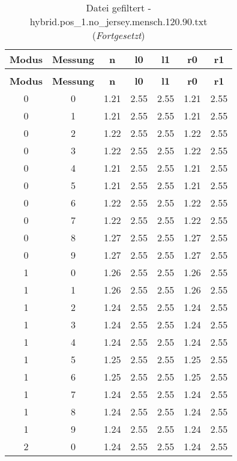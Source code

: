 \begin{longtable}{|c|c||c||c|c||c|c|}
	\caption{Datei gefiltert - hybrid.pos\_1.no\_jersey.mensch.120.90.txt} \label{tab:hybrid.pos-1.no-jersey.mensch.120.90.txt} \\ \hline
	\textbf{Modus} & \textbf{Messung} & \textbf{n} & \textbf{l0} & \textbf{l1} & \textbf{r0} & \textbf{r1}\\ \hline
	\endfirsthead
	\caption[]{Datei gefiltert - hybrid.pos\_1.no\_jersey.mensch.120.90.txt (\emph{Fortgesetzt})} \\ \hline
	\textbf{Modus} & \textbf{Messung} & \textbf{n} & \textbf{l0} & \textbf{l1} & \textbf{r0} & \textbf{r1}\\ \hline
	\endhead
	0 & 0 & 1.21 & 2.55 & 2.55 & 1.21 & 2.55 \\ \hline
	0 & 1 & 1.21 & 2.55 & 2.55 & 1.21 & 2.55 \\ \hline
	0 & 2 & 1.22 & 2.55 & 2.55 & 1.22 & 2.55 \\ \hline
	0 & 3 & 1.22 & 2.55 & 2.55 & 1.22 & 2.55 \\ \hline
	0 & 4 & 1.21 & 2.55 & 2.55 & 1.21 & 2.55 \\ \hline
	0 & 5 & 1.21 & 2.55 & 2.55 & 1.21 & 2.55 \\ \hline
	0 & 6 & 1.22 & 2.55 & 2.55 & 1.22 & 2.55 \\ \hline
	0 & 7 & 1.22 & 2.55 & 2.55 & 1.22 & 2.55 \\ \hline
	0 & 8 & 1.27 & 2.55 & 2.55 & 1.27 & 2.55 \\ \hline
	0 & 9 & 1.27 & 2.55 & 2.55 & 1.27 & 2.55 \\ \hline
	1 & 0 & 1.26 & 2.55 & 2.55 & 1.26 & 2.55 \\ \hline
	1 & 1 & 1.26 & 2.55 & 2.55 & 1.26 & 2.55 \\ \hline
	1 & 2 & 1.24 & 2.55 & 2.55 & 1.24 & 2.55 \\ \hline
	1 & 3 & 1.24 & 2.55 & 2.55 & 1.24 & 2.55 \\ \hline
	1 & 4 & 1.24 & 2.55 & 2.55 & 1.24 & 2.55 \\ \hline
	1 & 5 & 1.25 & 2.55 & 2.55 & 1.25 & 2.55 \\ \hline
	1 & 6 & 1.25 & 2.55 & 2.55 & 1.25 & 2.55 \\ \hline
	1 & 7 & 1.24 & 2.55 & 2.55 & 1.24 & 2.55 \\ \hline
	1 & 8 & 1.24 & 2.55 & 2.55 & 1.24 & 2.55 \\ \hline
	1 & 9 & 1.24 & 2.55 & 2.55 & 1.24 & 2.55 \\ \hline
	2 & 0 & 1.24 & 2.55 & 2.55 & 1.24 & 2.55 \\ \hline

\end{longtable}
